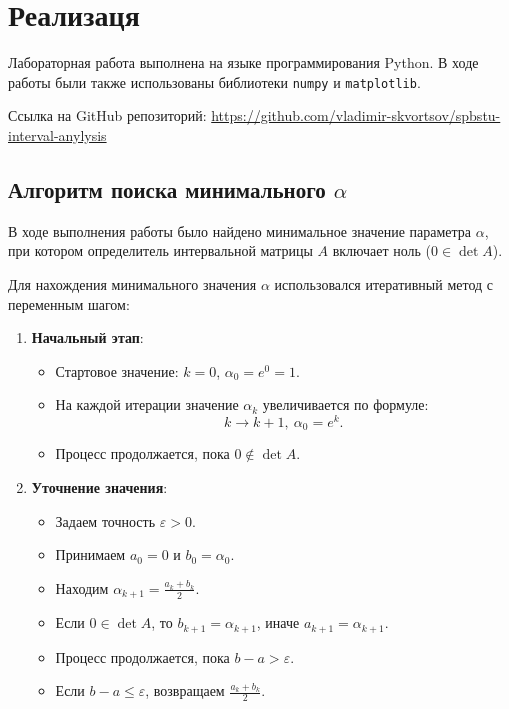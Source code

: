 \documentclass{article}
\begin{document}
  \section{Реализаця}

  Лабораторная работа выполнена на языке программирования Python. В ходе
  работы были также использованы библиотеки \verb!numpy! и
  \verb!matplotlib!.

  Ссылка на GitHub репозиторий:
  \href{https://github.com/vladimir-skvortsov/spbstu-interval-anylysis}{https://github.com/vladimir-skvortsov/spbstu-interval-anylysis}

  \subsection{Алгоритм поиска минимального \( \alpha \)}

  В ходе выполнения работы было найдено минимальное значение параметра
  \( \alpha \), при котором определитель интервальной матрицы \( A \)
  включает ноль (\( 0 \in \det A \)).

  Для нахождения минимального значения \(\alpha\) использовался
  итеративный метод с переменным шагом:

  \begin{enumerate}
    \item \textbf{Начальный этап}:
      \begin{itemize}
        \item Стартовое значение: \( k = 0 \), \(\alpha_0 = e^0 = 1\).
        \item На каждой итерации значение \( \alpha_k \) увеличивается по формуле:
          \[ k \to k + 1, \ \alpha_{0} = e^{k}. \]
        \item Процесс продолжается, пока \( 0 \notin \det A \).
      \end{itemize}

    \item \textbf{Уточнение значения}:
      \begin{itemize}
        \item Задаем точность \( \varepsilon > 0 \).
        \item Принимаем \( a_0 = 0 \) и \( b_0 = \alpha_0 \).
        \item Находим \( \alpha_{k+1} = \frac{a_k + b_k}{2} \).
        \item Если \( 0 \in \det A \), то \( b_{k+1} = \alpha_{k+1} \),
          иначе \( a_{k+1} = \alpha_{k+1} \).
        \item Процесс продолжается, пока \( b - a > \varepsilon \).
        \item Если \( b - a \leqslant \varepsilon \), возвращаем
          \( \frac{a_k + b_k}{2} \).
      \end{itemize}
  \end{enumerate}
\end{document}
